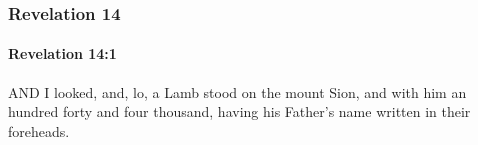 			\begin{framed}
			\scriptsize
				\begin{compactdesc}
					\item[SBLG] 
				\end{compactdesc}
			\end{framed}

	\subsubsection{Revelation 14} %
		\label{REVELATIONNT-14}
		
		\paragraph{Revelation 14:1} %
			\label{REVELATIONNT-14-1}

			AND I looked, and, lo, a Lamb stood on the mount Sion, and with him an hundred forty and four thousand, having his Father's name written in their foreheads.

